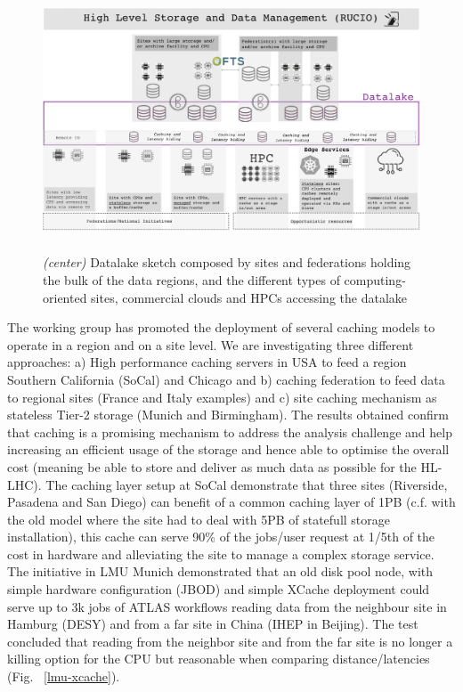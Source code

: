 \begin{figure}
  \centering
  \includegraphics[height=7.8cm]{datalake-sketch-square.png}
  \caption{{\em (center)} Datalake sketch composed by sites and federations holding the bulk of the data regions, and the different types of computing-oriented sites, commercial clouds and HPCs accessing the datalake }
  \label{datalake-sketch}
\end{figure}
The working group has promoted the deployment of several caching models to operate in a region and on a site level. We are investigating three different approaches: a) High performance caching servers in USA to feed a region Southern California (SoCal) and Chicago and b) caching federation to feed data to regional sites (France and Italy examples) and c) site caching mechanism as stateless Tier-2 storage (Munich and Birmingham). The results obtained confirm that caching is a promising mechanism to address the analysis challenge and help increasing an efficient usage of the storage and hence able to optimise the overall cost (meaning be able to store and deliver as much data as possible for the HL-LHC). The caching layer setup at SoCal demonstrate that three sites (Riverside, Pasadena and San Diego) can benefit of a common caching layer of 1PB (c.f. with the old model where the site had to deal with 5PB of statefull storage installation), this cache can serve 90\% of the jobs/user request at 1/5th of the cost in hardware and alleviating the site to manage a complex storage service.\\
The initiative in LMU Munich demonstrated that an old disk pool node, with simple hardware configuration (JBOD) and simple XCache deployment could serve up to 3k jobs of ATLAS workflows reading data from the neighbour site in Hamburg (DESY) and from a far site in China (IHEP in Beijing). The test concluded that reading from the neighbor site and from the far site is no longer a killing option for the CPU but reasonable when comparing distance/latencies (Fig. ~\ref{lmu-xcache}).

